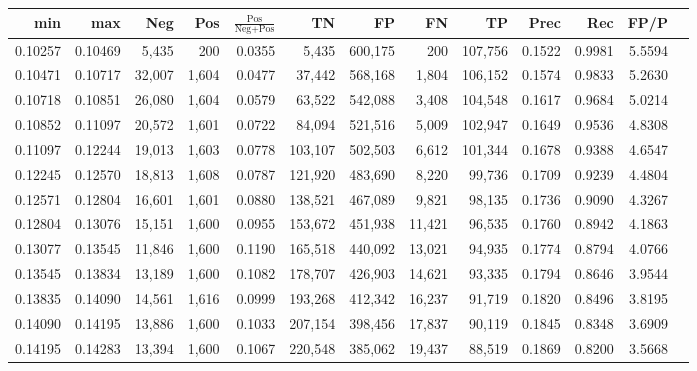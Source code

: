 \begin{tabular}{rrrrrrrrrrrrr}
\toprule
    min &     max &    Neg &   Pos & $\frac{\text{Pos}}{\text{Neg}+\text{Pos}}$ &      TN &      FP &      FN &      TP &   Prec &    Rec &   FP/P \\
\midrule
0.10257 & 0.10469 &  5,435 &   200 &                                     0.0355 &   5,435 & 600,175 &     200 & 107,756 & 0.1522 & 0.9981 & 5.5594 \\
0.10471 & 0.10717 & 32,007 & 1,604 &                                     0.0477 &  37,442 & 568,168 &   1,804 & 106,152 & 0.1574 & 0.9833 & 5.2630 \\
0.10718 & 0.10851 & 26,080 & 1,604 &                                     0.0579 &  63,522 & 542,088 &   3,408 & 104,548 & 0.1617 & 0.9684 & 5.0214 \\
0.10852 & 0.11097 & 20,572 & 1,601 &                                     0.0722 &  84,094 & 521,516 &   5,009 & 102,947 & 0.1649 & 0.9536 & 4.8308 \\
0.11097 & 0.12244 & 19,013 & 1,603 &                                     0.0778 & 103,107 & 502,503 &   6,612 & 101,344 & 0.1678 & 0.9388 & 4.6547 \\
0.12245 & 0.12570 & 18,813 & 1,608 &                                     0.0787 & 121,920 & 483,690 &   8,220 &  99,736 & 0.1709 & 0.9239 & 4.4804 \\
0.12571 & 0.12804 & 16,601 & 1,601 &                                     0.0880 & 138,521 & 467,089 &   9,821 &  98,135 & 0.1736 & 0.9090 & 4.3267 \\
0.12804 & 0.13076 & 15,151 & 1,600 &                                     0.0955 & 153,672 & 451,938 &  11,421 &  96,535 & 0.1760 & 0.8942 & 4.1863 \\
0.13077 & 0.13545 & 11,846 & 1,600 &                                     0.1190 & 165,518 & 440,092 &  13,021 &  94,935 & 0.1774 & 0.8794 & 4.0766 \\
0.13545 & 0.13834 & 13,189 & 1,600 &                                     0.1082 & 178,707 & 426,903 &  14,621 &  93,335 & 0.1794 & 0.8646 & 3.9544 \\
0.13835 & 0.14090 & 14,561 & 1,616 &                                     0.0999 & 193,268 & 412,342 &  16,237 &  91,719 & 0.1820 & 0.8496 & 3.8195 \\
0.14090 & 0.14195 & 13,886 & 1,600 &                                     0.1033 & 207,154 & 398,456 &  17,837 &  90,119 & 0.1845 & 0.8348 & 3.6909 \\
0.14195 & 0.14283 & 13,394 & 1,600 &                                     0.1067 & 220,548 & 385,062 &  19,437 &  88,519 & 0.1869 & 0.8200 & 3.5668 \\

\end{tabular}
